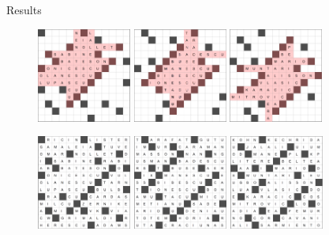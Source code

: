 \documentclass[aspectratio=169,usenames,dvipsnames]{beamer}
\numberwithin{equation}{section}
\numberwithin{theorem}{section}
\numberwithin{lem}{section}
\numberwithin{df}{section}
\begin{document}

\begin{frame}{Results}

\begin{figure}
\includegraphics[height=3.1cm]{figs/2013a.png}
%
\hspace{1cm}
%
\includegraphics[height=3.1cm]{figs/2021a.png}
%
\hspace{1cm}
%
\includegraphics[height=3.1cm]{figs/2023a.png}

\vspace{0.25cm}

\includegraphics[height=3.1cm]{figs/2013b.png}
%
\hspace{1cm}
%
\includegraphics[height=3.1cm]{figs/2021b.png}
%
\hspace{1cm}
%
\includegraphics[height=3.1cm]{figs/2023b.png}


\end{figure}
\end{frame}
\end{document}
